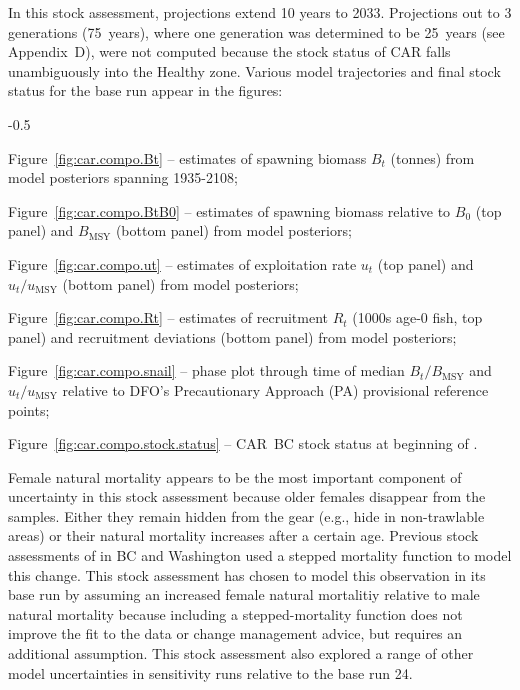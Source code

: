 \documentclass[11pt]{book}
\newcommand{\Bmsy}{B_\text{MSY}}
\newcommand{\umsy}{u_\text{MSY}}
\begin{document}
In this stock assessment, projections extend 10 years to 2033. 
Projections out to 3 generations (75~years), where one generation was determined to be 25~years (see Appendix~D), were not computed because the stock status of CAR falls unambiguously into the Healthy zone.
Various model trajectories and final stock status for the base run appear in the figures:
\begin{itemize_csas}{-0.5}{}
  \item Figure~\ref{fig:car.compo.Bt}     -- estimates of spawning biomass $B_t$ (tonnes) from model posteriors spanning 1935-2108;
  \item Figure~\ref{fig:car.compo.BtB0}   -- estimates of spawning biomass relative to $B_0$ (top panel) and $\Bmsy$ (bottom panel) from model posteriors;
  \item Figure~\ref{fig:car.compo.ut}     -- estimates of exploitation rate $u_t$ (top panel) and $u_t/\umsy$ (bottom panel) from model posteriors;
  \item Figure~\ref{fig:car.compo.Rt}     -- estimates of recruitment $R_t$ (1000s age-0 fish, top panel) and recruitment deviations (bottom panel) from model posteriors;
  \item Figure~\ref{fig:car.compo.snail}  -- phase plot through time of median $B_t/\Bmsy$ and $u_t/\umsy$ relative to DFO's Precautionary Approach (PA) provisional reference points;
  \item Figure~\ref{fig:car.compo.stock.status} -- CAR~BC stock status at beginning of \currYear{}.
\end{itemize_csas}


Female natural mortality appears to be the most important component of uncertainty in this stock assessment because older females disappear from the samples.
Either they remain hidden from the gear (e.g., hide in non-trawlable areas) or their natural mortality increases after a certain age.
Previous stock assessments of \SPC{} in BC and Washington used a stepped mortality function to model this change. 
This stock assessment has chosen to model this observation in its base run by assuming an increased female natural mortalitiy relative to male natural mortality because including a stepped-mortality function does not improve the fit to the data or change management advice, but requires an additional assumption.
This stock assessment also explored a range of other model uncertainties in sensitivity runs relative to the base run 24.
\end{document}
